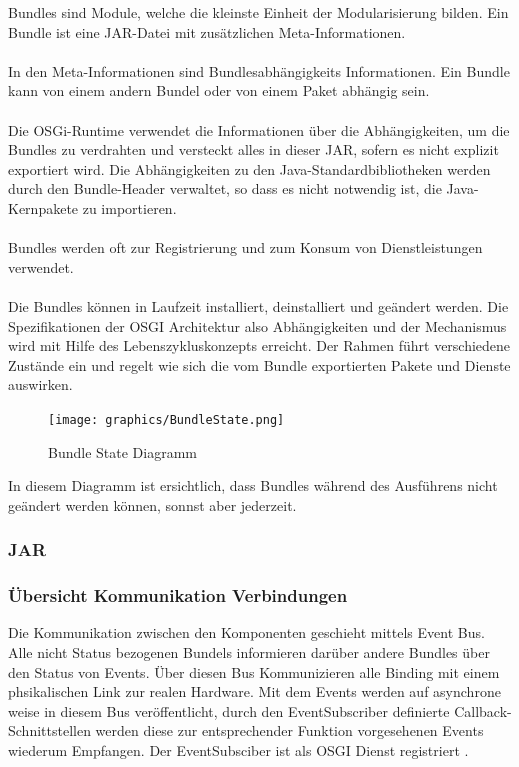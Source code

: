 Bundles sind Module, welche die kleinste Einheit der Modularisierung bilden. Ein Bundle ist eine JAR-Datei mit zusätzlichen Meta-Informationen.\\
\\
In den Meta-Informationen sind Bundlesabhängigkeits Informationen. Ein Bundle kann von einem andern Bundel oder von einem Paket abhängig sein.\\
\\
Die OSGi-Runtime verwendet die Informationen über die Abhängigkeiten, um die Bundles zu verdrahten und versteckt alles in dieser JAR, sofern es nicht explizit exportiert wird. Die Abhängigkeiten zu den Java-Standardbibliotheken werden durch den Bundle-Header verwaltet, so dass es nicht notwendig ist, die Java-Kernpakete zu importieren.\\
\\
Bundles werden oft zur Registrierung und zum Konsum von Dienstleistungen verwendet.\\
\\
Die Bundles können in Laufzeit installiert, deinstalliert und geändert werden. Die Spezifikationen der OSGI Architektur also Abhängigkeiten und der Mechanismus wird mit Hilfe des Lebenszykluskonzepts erreicht. Der Rahmen führt verschiedene Zustände ein und regelt wie sich die vom Bundle exportierten Pakete und Dienste auswirken. 

 \begin{figure}[H]
	\centering
	\texttt{[image: graphics/BundleState.png]}
	\caption{Bundle State Diagramm \cite{noauthor_osgi_nodate}} 	
	\label{pic: BundleState}
\end{figure} 

In diesem Diagramm ist ersichtlich, dass Bundles während des Ausführens nicht geändert werden können, sonnst aber jederzeit.

\subsubsection{JAR}
\subsubsection{Übersicht Kommunikation Verbindungen}
Die Kommunikation zwischen den Komponenten geschieht mittels Event Bus. Alle nicht Status bezogenen Bundels informieren darüber andere Bundles über den Status von Events. Über diesen Bus Kommunizieren alle Binding mit einem phsikalischen Link zur realen Hardware. Mit dem Events werden auf asynchrone weise in diesem Bus veröffentlicht, durch den EventSubscriber definierte Callback-Schnittstellen werden diese zur entsprechender Funktion vorgesehenen Events wiederum Empfangen. Der EventSubsciber ist als OSGI Dienst registriert \cite{noauthor_event_nodate}.

